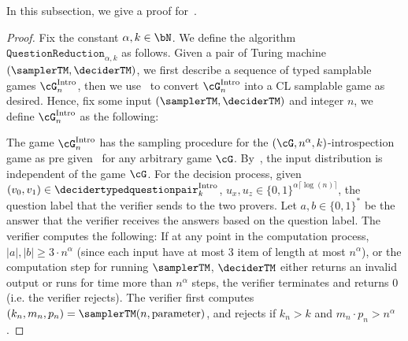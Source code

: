In this subsection, we give a proof for~.
\begin{proof}
	Fix the constant $\alpha,k \in \bN$. We define the algorithm $\texttt{QuestionReduction}_{\alpha, k}$ as follows. Given a pair of Turing machine $(\samplerTM, \deciderTM)$, we first describe a sequence of typed samplable games $\cG_{n}^{\text{Intro}}$, then we use~ to convert $\cG_{n}^{\text{Intro}}$ into a CL samplable game as desired. Hence, fix some input $(\samplerTM, \deciderTM)$ and integer $n$, we define $\cG_{n}^{\text{Intro}}$ as the following:
	
	The game $\cG_{n}^{\text{Intro}}$ has the sampling procedure for the $(\cG, n^{\alpha}, k)$-introspection game as pre given~ for any arbitrary game $\cG$. By~, the input distribution is independent of the game $\cG$. For the decision process, given $(v_0, v_1) \in \decidertypedquestionpair^{\text{Intro}}_k$, $u_x, u_z \in \{0,1\}^{\alpha \lceil\log(n) \rceil}$, the question label that the verifier sends to the two provers. Let $a,b \in \{0,1\}^*$ be the answer that the verifier receives the answers based on the question label. The verifier computes the following: If at any point in the computation process, $|a|, |b| \geq 3 \cdot n^{\alpha}$ (since each input have at most 3 item of length at most $n^{\alpha}$), or the computation step for running $\samplerTM$, $\deciderTM$ either returns an invalid output or runs for time more than $n^{\alpha}$ steps, the verifier terminates and returns $0$ (i.e. the verifier rejects). The verifier first computes $(k_n, m_n , p_n) = \samplerTM(n, \text{parameter})$, and rejects if $k_n > k$ and $m_n \cdot p_n > n^{\alpha}$. 
	

\end{proof}
